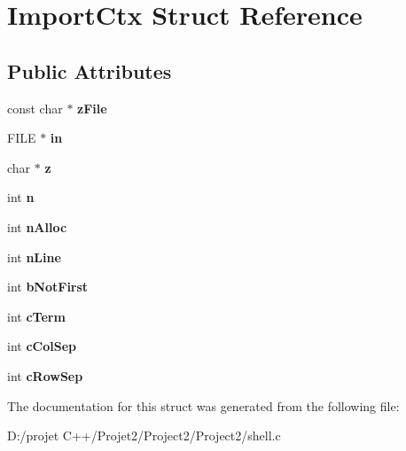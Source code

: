 \hypertarget{struct_import_ctx}{}\section{Import\+Ctx Struct Reference}
\label{struct_import_ctx}
\subsection*{Public Attributes}
\begin{DoxyCompactItemize}
\item 
\mbox{\label{struct_import_ctx_a88414dab6838f62acc8dbb3d2afe299d}} 
const char $\ast$ {\bfseries z\+File}
\item 
\mbox{\label{struct_import_ctx_a63c21cba47680ddd0c842866ab5486e5}} 
F\+I\+LE $\ast$ {\bfseries in}
\item 
\mbox{\label{struct_import_ctx_ade5d138b0f146f8bed3e83bfbb450f2e}} 
char $\ast$ {\bfseries z}
\item 
\mbox{\label{struct_import_ctx_a93c89715a8ced4d28b9dcb29a083f748}} 
int {\bfseries n}
\item 
\mbox{\label{struct_import_ctx_a04606938856e8071c34af5c68607734b}} 
int {\bfseries n\+Alloc}
\item 
\mbox{\label{struct_import_ctx_a7b910b2b078d291e84ad333792efb000}} 
int {\bfseries n\+Line}
\item 
\mbox{\label{struct_import_ctx_ac67e1cef6e63eb51ef6180ecfc208839}} 
int {\bfseries b\+Not\+First}
\item 
\mbox{\label{struct_import_ctx_a32c66d4ff064ed9d5775ec6a0bab66ba}} 
int {\bfseries c\+Term}
\item 
\mbox{\label{struct_import_ctx_a5c5dc07e3bd063d2da26da4a83f46576}} 
int {\bfseries c\+Col\+Sep}
\item 
\mbox{\label{struct_import_ctx_a9b23999b41777a9726b91ec61b74f21a}} 
int {\bfseries c\+Row\+Sep}
\end{DoxyCompactItemize}


The documentation for this struct was generated from the following file\+:\begin{DoxyCompactItemize}
\item 
D\+:/projet C++/\+Projet2/\+Project2/\+Project2/shell.\+c\end{DoxyCompactItemize}
